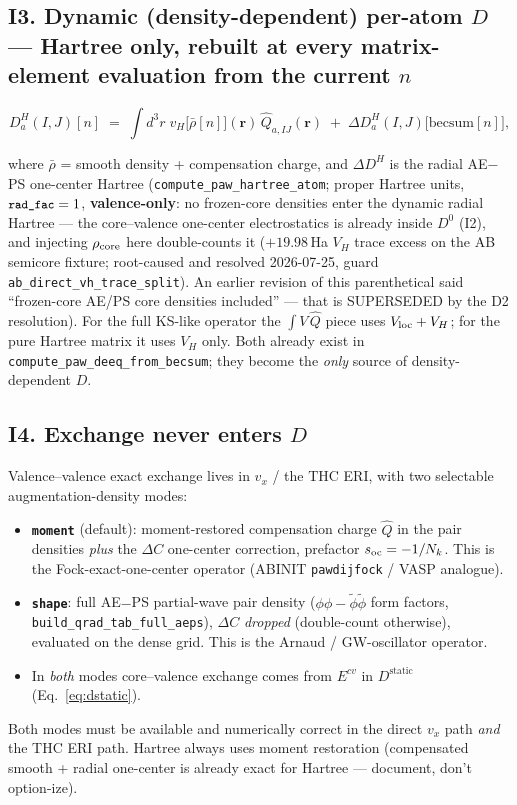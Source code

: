 \documentclass[11pt]{article}
\newcommand{\code}[1]{\texttt{\small #1}}
\newcommand{\Dstat}{D^{\mathrm{static}}}
\newcommand{\Qhat}{\hat{Q}}
\newcommand{\phit}{\tilde{\phi}}
\newcommand{\becsum}{\mathrm{becsum}}
\begin{document}
\subsection*{I3. Dynamic (density-dependent) per-atom $D$ --- Hartree only,
rebuilt at every matrix-element evaluation from the current $n$}

\begin{keybox}
\begin{equation}
D^{H}_{a}(I,J)[n] \;=\;
\int \! d^3r\; v_H\big[\bar\rho[n]\big](\mathbf{r})\, \Qhat_{a,IJ}(\mathbf{r})
\;+\; \Delta D^{H}_{a}(I,J)\big[\becsum[n]\big],
\label{eq:dh}
\end{equation}
\end{keybox}
where $\bar\rho$ = smooth density + compensation charge, and $\Delta D^{H}$
is the radial AE$-$PS one-center Hartree
(\code{compute\_paw\_hartree\_atom}; proper Hartree units,
$\code{rad\_fac}=1$, \textbf{valence-only}: no frozen-core densities enter
the dynamic radial Hartree --- the core--valence one-center electrostatics
is already inside $D^0$ (I2), and injecting $\rho_{\rm core}$ here
double-counts it ($+19.98$\,Ha $V_H$ trace excess on the AB semicore
fixture; root-caused and resolved 2026-07-25, guard
\code{ab\_direct\_vh\_trace\_split}). An earlier revision of this
parenthetical said ``frozen-core AE/PS core densities included'' --- that
is SUPERSEDED by the D2 resolution). For the full
KS-like operator the $\int V\,\Qhat$ piece uses $V_{\rm loc}+V_H$; for the
pure Hartree matrix it uses $V_H$ only. Both already exist in
\code{compute\_paw\_deeq\_from\_becsum}; they become the \emph{only} source
of density-dependent $D$.

\subsection*{I4. Exchange never enters $D$}

Valence--valence exact exchange lives in $v_x$ / the THC ERI, with two
selectable augmentation-density modes:
\begin{keybox}
\begin{itemize}[leftmargin=1.6em]
\item \textbf{\code{moment}} (default): moment-restored compensation charge
$\Qhat$ in the pair densities \emph{plus} the $\Delta C$ one-center
correction, prefactor $s_{\rm oc} = -1/N_k$. This is the
Fock-exact-one-center operator (ABINIT \code{pawdijfock} / VASP analogue).
\item \textbf{\code{shape}}: full AE$-$PS partial-wave pair density
($\phi\phi - \phit\phit$ form factors, \code{build\_qrad\_tab\_full\_aeps}),
$\Delta C$ \emph{dropped} (double-count otherwise), evaluated on the dense
grid. This is the Arnaud / GW-oscillator operator.
\item In \emph{both} modes core--valence exchange comes from $E^{cv}$ in
$\Dstat$ (Eq.~\ref{eq:dstatic}).
\end{itemize}
\end{keybox}
Both modes must be available and numerically correct in the direct $v_x$
path \emph{and} the THC ERI path. Hartree always uses moment restoration
(compensated smooth + radial one-center is already exact for Hartree ---
document, don't option-ize).
\end{document}
